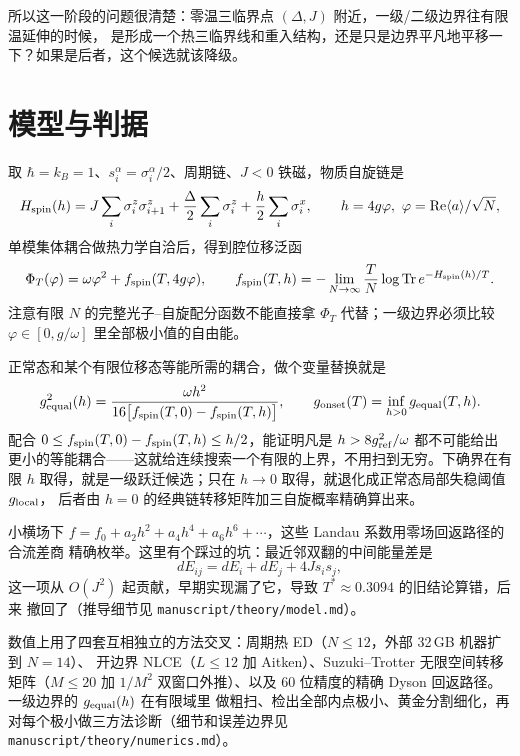 \documentclass[UTF8,11pt,a4paper]{ctexart}
\begin{document}
所以这一阶段的问题很清楚：零温三临界点 $(\Delta,J)$ 附近，一级/二级边界往有限温延伸的时候，
是形成一个热三临界线和重入结构，还是只是边界平凡地平移一下？如果是后者，这个候选就该降级。

\section{模型与判据}

取 $\hbar=k_B=1$、$s_i^\alpha=\sigma_i^\alpha/2$、周期链、$J<0$ 铁磁，物质自旋链是
\begin{equation}
  H_{\rm spin}(h)=J\sum_i\sigma_i^z\sigma_{i+1}^z+\frac{\Delta}{2}\sum_i\sigma_i^z
  +\frac{h}{2}\sum_i\sigma_i^x,\qquad h=4g\varphi,\ \varphi=\mathrm{Re}\langle a\rangle/\sqrt N,
  \label{eq:Hspin}
\end{equation}
单模集体耦合做热力学自洽后，得到腔位移泛函
\begin{equation}
  \Phi_T(\varphi)=\omega\varphi^2+f_{\rm spin}(T,4g\varphi),\qquad
  f_{\rm spin}(T,h)=-\lim_{N\to\infty}\frac{T}{N}\log\operatorname{Tr}e^{-H_{\rm spin}(h)/T}.
  \label{eq:Phi}
\end{equation}
注意有限 $N$ 的完整光子--自旋配分函数不能直接拿 $\Phi_T$ 代替；一级边界必须比较
$\varphi\in[0,g/\omega]$ 里全部极小值的自由能。

正常态和某个有限位移态等能所需的耦合，做个变量替换就是
\begin{equation}
  g_{\rm equal}^2(h)=\frac{\omega h^2}{16\big[f_{\rm spin}(T,0)-f_{\rm spin}(T,h)\big]},
  \qquad g_{\rm onset}(T)=\inf_{h>0}g_{\rm equal}(T,h).
  \label{eq:gequal}
\end{equation}
配合 $0\le f_{\rm spin}(T,0)-f_{\rm spin}(T,h)\le h/2$，能证明凡是 $h>8g_{\rm ref}^2/\omega$
都不可能给出更小的等能耦合——这就给连续搜索一个有限的上界，不用扫到无穷。下确界在有限
$h$ 取得，就是一级跃迁候选；只在 $h\to0$ 取得，就退化成正常态局部失稳阈值 $g_{\rm local}$，
后者由 $h=0$ 的经典链转移矩阵加三自旋概率精确算出来。

小横场下 $f=f_0+a_2h^2+a_4h^4+a_6h^6+\cdots$，这些 Landau 系数用零场回返路径的合流差商
精确枚举。这里有个踩过的坑：最近邻双翻的中间能量差是
\begin{equation}
  dE_{ij}=dE_i+dE_j+4J s_i s_j,
  \label{eq:dEij}
\end{equation}
这一项从 $O(J^2)$ 起贡献，早期实现漏了它，导致 $T^\ast\approx0.3094$ 的旧结论算错，后来
撤回了（推导细节见 \texttt{manuscript/theory/model.md}）。

数值上用了四套互相独立的方法交叉：周期热 ED（$N\le12$，外部 32\,GB 机器扩到 $N=14$）、
开边界 NLCE（$L\le12$ 加 Aitken）、Suzuki--Trotter 无限空间转移矩阵（$M\le20$ 加 $1/M^2$
双窗口外推）、以及 60 位精度的精确 Dyson 回返路径。一级边界的 $g_{\rm equal}(h)$ 在有限域里
做粗扫、检出全部内点极小、黄金分割细化，再对每个极小做三方法诊断（细节和误差边界见
\texttt{manuscript/theory/numerics.md}）。
\end{document}
